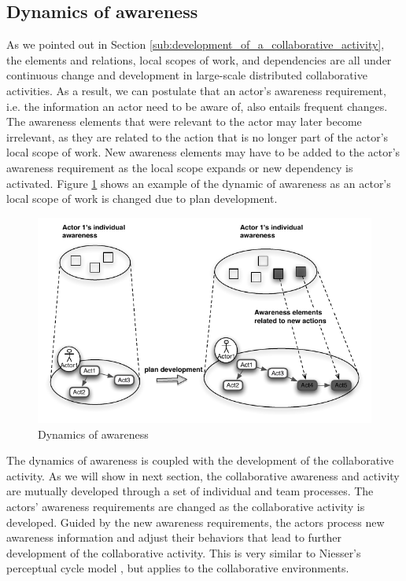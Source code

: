 \subsection{Dynamics of awareness} %
\label{sub:dynamics_of_awareness}
As we pointed out in Section \ref{sub:development_of_a_collaborative_activity}, the elements and relations, local scopes of work, and dependencies are all under continuous change and development in large-scale distributed collaborative activities. As a result, we can postulate that an actor's awareness requirement, i.e. the information an actor need to be aware of, also entails frequent changes. The awareness elements that were relevant to the actor may later become irrelevant, as they are related to the action that is no longer part of the actor's local scope of work. New awareness elements may have to be added to the actor's awareness requirement as the local scope expands or new dependency is activated. Figure \ref{fig:dynamics_of_awareness} shows an example of the dynamic of awareness as an actor's local scope of work is changed due to plan development.

\begin{figure}[htbp] %
   \centering
   \includegraphics{dynamics_of_awareness.pdf} 
   \caption{Dynamics of awareness}
   \label{fig:dynamics_of_awareness}
\end{figure}

The dynamics of awareness is coupled with the development of the collaborative activity. As we will show in next section, the collaborative awareness and activity are mutually developed through a set of individual and team processes. The actors' awareness requirements are changed as the collaborative activity is developed. Guided by the new awareness requirements, the actors process new awareness information and adjust their behaviors that lead to further development of the collaborative activity. This is very similar to Niesser's perceptual cycle model \cite{neisser1976cognition}, but applies to the collaborative environments.

